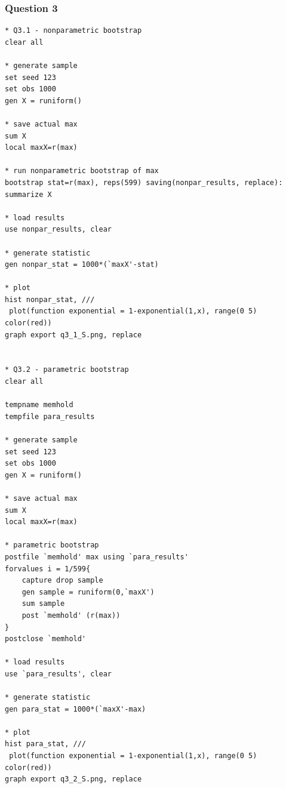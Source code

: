 \documentclass[12pt]{article}
\begin{document}
\subsubsection{Question 3}
\begin{verbatim}
* Q3.1 - nonparametric bootstrap
clear all

* generate sample
set seed 123
set obs 1000
gen X = runiform()

* save actual max
sum X
local maxX=r(max)

* run nonparametric bootstrap of max
bootstrap stat=r(max), reps(599) saving(nonpar_results, replace): summarize X

* load results
use nonpar_results, clear

* generate statistic
gen nonpar_stat = 1000*(`maxX'-stat)

* plot
hist nonpar_stat, ///
 plot(function exponential = 1-exponential(1,x), range(0 5) color(red))
graph export q3_1_S.png, replace


* Q3.2 - parametric bootstrap
clear all

tempname memhold
tempfile para_results

* generate sample
set seed 123
set obs 1000
gen X = runiform()

* save actual max
sum X
local maxX=r(max)

* parametric bootstrap
postfile `memhold' max using `para_results'
forvalues i = 1/599{
	capture drop sample
	gen sample = runiform(0,`maxX')
	sum sample
	post `memhold' (r(max))
}
postclose `memhold'

* load results
use `para_results', clear

* generate statistic
gen para_stat = 1000*(`maxX'-max)

* plot
hist para_stat, ///
 plot(function exponential = 1-exponential(1,x), range(0 5) color(red))
graph export q3_2_S.png, replace
\end{verbatim}
\end{document}
